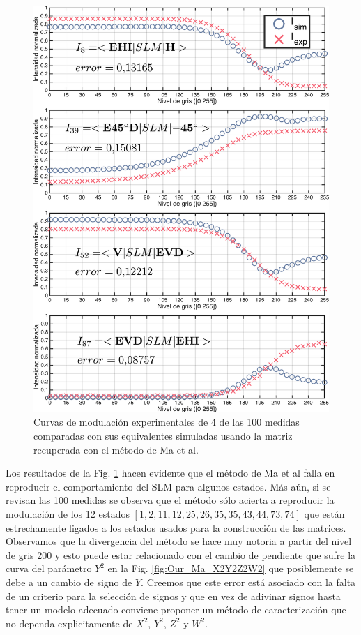 \begin{figure}[h!]
\centering
\includegraphics[scale=.5]{some_Ma_caracterization_results.pdf}
\caption[Curvas de modulación experimentales comparadas con las
simuladas usando el modelo obtenido con el método de Ma et al]{Curvas de modulación
  experimentales de 4 de las 100 medidas comparadas con sus
  equivalentes simuladas usando la matriz recuperada con el método de Ma et al.}
\label{fig:Ma_caracterization_results}
\end{figure}
Los resultados de la Fig. \ref{fig:Ma_caracterization_results} hacen
evidente que el método de Ma et al falla en reproducir el comportamiento del SLM
para algunos estados. Más aún, si se revisan las 100 medidas se observa que el
método sólo acierta a reproducir la modulación de los 12 estados $
[1,2,11,12,25,26,35,35,43,44,73,74]$ que están estrechamente ligados a
los estados usados para la construcción de las matrices. Observamos
que la divergencia del método se hace muy notoria a partir del nivel
de gris 200 y esto puede estar relacionado con el cambio de pendiente
que sufre la curva del parámetro $Y^2$ en la
Fig. \ref{fig:Our_Ma_X2Y2Z2W2} que posiblemente se debe a un cambio de
signo de $Y$. Creemos que este error está asociado con la
falta de un criterio para la selección de signos y que en vez de
adivinar signos hasta tener un modelo adecuado conviene proponer un
método de caracterización que no dependa explicitamente de $X^2$, $Y^2$, $Z^2$ y $W^2$.

